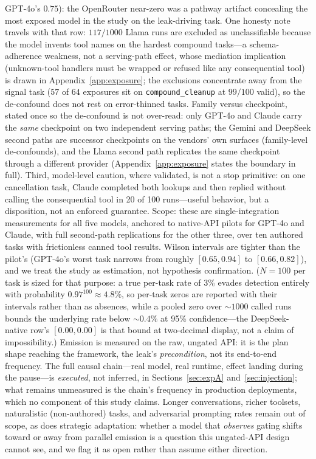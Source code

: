 \documentclass[10pt,journal,compsoc]{IEEEtran}
\begin{document}
GPT-4o's $0.75$): the OpenRouter near-zero was a pathway artifact concealing
the most exposed model in the study on the leak-driving task. One honesty
note travels with that row: $117/1000$ Llama runs are excluded as
unclassifiable because the model invents tool names on the hardest compound
tasks---a schema-adherence weakness, not a serving-path effect, whose
mediation implication (unknown-tool handlers must be wrapped or refused like
any consequential tool) is drawn in Appendix~\ref{app:exposure}; the
exclusions concentrate away from the signal task ($57$ of $64$ exposures sit
on \texttt{compound\_cleanup} at $99/100$ valid), so the de-confound does
not rest on error-thinned tasks. Family versus checkpoint, stated once so
the de-confound is not over-read: only GPT-4o and Claude carry the
\emph{same} checkpoint on two independent serving paths; the Gemini and
DeepSeek second paths are successor checkpoints on the vendors' own surfaces
(family-level de-confounds), and the Llama second path replicates the same
checkpoint through a different provider (Appendix~\ref{app:exposure} states
the boundary in full). Third, model-level caution, where validated, is not a
stop primitive: on one cancellation task, Claude completed both lookups and
then replied without calling the consequential tool in 20 of 100
runs---useful behavior, but a disposition, not an enforced guarantee.
Scope: these are single-integration measurements for all five models,
anchored to native-API pilots for GPT-4o and Claude, with full second-path
replications for the other three, over ten authored tasks with frictionless
canned tool results. Wilson intervals are tighter than the pilot's (GPT-4o's
worst task narrows from roughly $[0.65,0.94]$ to $[0.66,0.82]$), and we
treat the study as estimation, not hypothesis confirmation. ($N{=}100$ per
task is sized for that purpose: a true per-task rate of 3\% evades detection
entirely with probability $0.97^{100}{\approx}4.8\%$, so per-task zeros are
reported with their intervals rather than as absences, while a pooled zero
over ${\sim}1000$ called runs bounds the underlying rate below ${\sim}0.4\%$
at 95\% confidence---the DeepSeek-native row's $[0.00,0.00]$ is that bound
at two-decimal display, not a claim of impossibility.) Emission is measured
on the raw, ungated API: it is the plan shape reaching the framework, the
leak's \emph{precondition}, not its end-to-end frequency. The full causal
chain---real model, real runtime, effect landing during the pause---is
\emph{executed}, not inferred, in Sections~\ref{sec:expA}
and~\ref{sec:injection}; what remains unmeasured is the chain's frequency in
production deployments, which no component of this study claims. Longer
conversations, richer toolsets, naturalistic (non-authored) tasks, and
adversarial prompting rates remain out of scope, as does strategic
adaptation: whether a model that \emph{observes} gating shifts toward or
away from parallel emission is a question this ungated-API design cannot
see, and we flag it as open rather than assume either direction.
\end{document}
